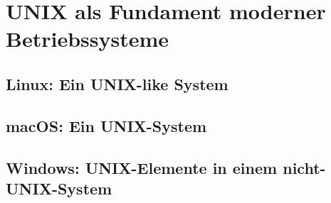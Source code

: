\section{UNIX als Fundament moderner Betriebssysteme}
\subsection{Linux: Ein UNIX-like System}
\subsection{macOS: Ein UNIX-System}
\subsection{Windows: UNIX-Elemente in einem nicht-UNIX-System}